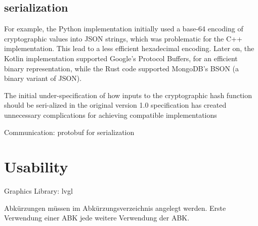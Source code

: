 \subsection{serialization}




For example, the Python implementation initially used a base-64 encoding of cryptographic values into JSON strings, which was problematic for the C++ implementation. 
This lead to a less efficient hexadecimal encoding. Later on, the Kotlin implementation supported Google’s Protocol Buffers, for an efficient binary representation, while the Rust code supported MongoDB’s BSON (a binary variant of JSON). 

The initial under-specification of how inputs to the cryptographic hash function should be seri-alized in the original version 1.0 specification has created unnecessary complications for achieving compatible implementations 

\cite[23-24]{eg-paper}


Communication: protobuf for serialization



\section{Usability}

Graphics Library: lvgl




Abkürzungen müssen im Abkürzungsverzeichnis angelegt werden.
Erste Verwendung einer \ac{ABK} jede weitere Verwendung der \ac{ABK}.

\nocite{*}

